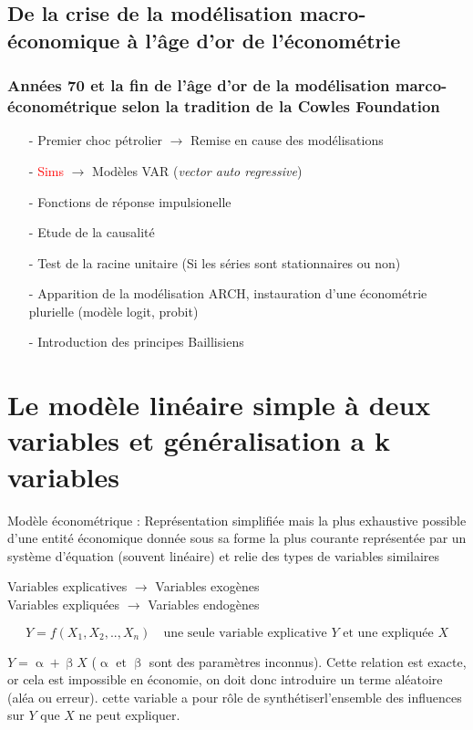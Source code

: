 \documentclass{article}
\begin{document}
\subsection{De la crise de la modélisation macro-économique à l'âge d'or de l'économétrie}
\subsubsection{Années 70 et la fin de l'âge d'or de la modélisation marco-économétrique selon la tradition de la Cowles Foundation}
\begin{itemize}
    \item[-] Premier choc pétrolier $\rightarrow$ Remise en cause des modélisations
    \item[-] \textcolor{red}{Sims} $\rightarrow$ Modèles VAR (\textit{vector auto regressive})
    \item[-] Fonctions de réponse impulsionelle
    \item[-] Etude de la causalité
    \item[-] Test de la racine unitaire (Si les séries sont stationnaires ou non)
    \item[-] Apparition de la modélisation ARCH, instauration d'une économétrie plurielle (modèle logit, probit)
    \item[-] Introduction des principes Baillisiens
\end{itemize}

\section{Le modèle linéaire simple à deux variables et généralisation a k variables}
Modèle économétrique : Représentation simplifiée mais la plus exhaustive possible d'une entité économique donnée sous sa forme la plus courante représentée par un système d'équation (souvent linéaire) et relie des types de variables similaires
\begin{center}
    Variables explicatives $\rightarrow$ Variables exogènes\\
    Variables expliquées $\rightarrow$ Variables endogènes
\end{center}

\[ Y = f(X_1,X_2,..,X_n) \quad \textrm{une seule variable explicative } Y \textrm{ et une expliquée }X \]

\( Y = \upalpha + \upbeta X\) (\(\upalpha \textrm{ et } \upbeta\) sont des paramètres inconnus). Cette relation est exacte, or cela est impossible en économie, on doit donc introduire un terme aléatoire (aléa ou erreur). cette variable a pour rôle de synthétiserl'ensemble des influences sur \(Y \textrm{ que } X\) ne peut expliquer. \newline
\end{document}

